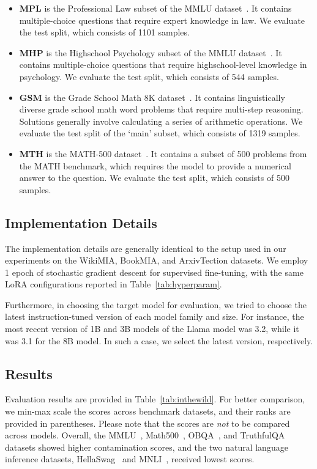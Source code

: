 \begin{itemize}[leftmargin=*]
    \item \textbf{MPL} is the Professional Law subset of the MMLU dataset~\cite{hendryckstest2021}. It contains multiple-choice questions that require expert knowledge in law. We evaluate the test split, which consists of 1101 samples.
    \item \textbf{MHP} is the Highschool Psychology subset of the MMLU dataset~\cite{hendryckstest2021}. It contains multiple-choice questions that require highschool-level knowledge in psychology. We evaluate the test split, which consists of 544 samples.
    \item \textbf{GSM} is the Grade School Math 8K dataset~\cite{cobbe2021gsm8k}. It contains linguistically diverse grade school math word problems that require multi-step reasoning. Solutions generally involve calculating a series of arithmetic operations. We evaluate the test split of the `main' subset, which consists of 1319 samples.
    \item \textbf{MTH} is the MATH-500 dataset~\cite{lightmanlet}. It contains a subset of 500 problems from the MATH benchmark, which requires the model to provide a numerical answer to the question. We evaluate the test split, which consists of 500 samples.
\end{itemize}


\subsection{Implementation Details}
The implementation details are generally identical to the setup used in our experiments on the WikiMIA, BookMIA, and ArxivTection datasets.
We employ 1 epoch of stochastic gradient descent for supervised fine-tuning, with the same LoRA configurations reported in Table~\ref{tab:hyperparam}.

Furthermore, in choosing the target model for evaluation, we tried to choose the latest instruction-tuned version of each model family and size.
For instance, the most recent version of 1B and 3B models of the Llama model was 3.2, while it was 3.1 for the 8B model.
In such a case, we select the latest version, respectively.


\subsection{Results}
Evaluation results are provided in Table~\ref{tab:inthewild}.
For better comparison, we min-max scale the scores across benchmark datasets, and their ranks are provided in parentheses.
Please note that the scores are \textit{not} to be compared across models.
Overall, the MMLU~\cite{hendryckstest2021}, Math500~\cite{lightmanlet}, OBQA~\cite{OpenBookQA2018}, and TruthfulQA~\cite{lin2022truthfulqa} datasets showed higher contamination scores, and the two natural language inference datasets, HellaSwag~\cite{zellers2019hellaswag} and MNLI~\cite{N18-1101}, received lowest scores.